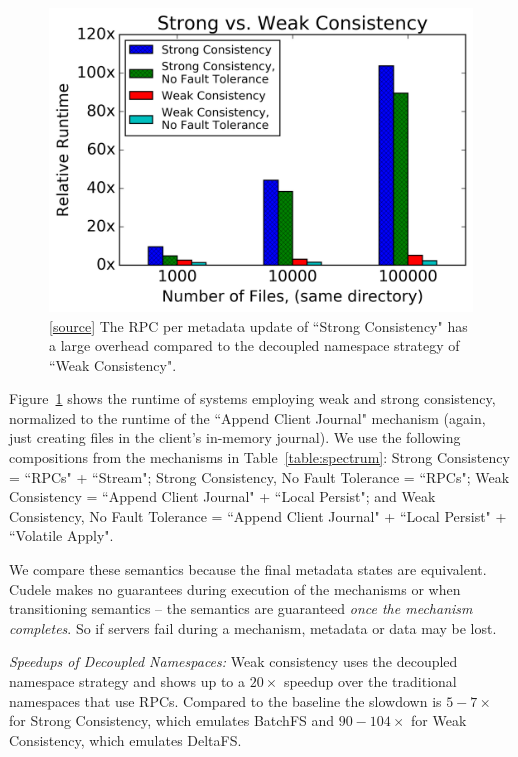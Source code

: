 \begin{figure}[tb]
\centering
\includegraphics[width=1.0\linewidth]{graphs/slowdown-strong-v-weak.png}
\caption{
[\href{https://...}{source}]
The RPC per metadata update of ``Strong Consistency" has a large
overhead compared to the decoupled namespace strategy of ``Weak
Consistency".\label{fig:slowdown-strong-weak}}
\end{figure}

Figure~\ref{fig:slowdown-strong-weak} shows the runtime of systems employing
weak and strong consistency, normalized to the runtime of the ``Append Client Journal"
mechanism (again, just creating files in the client's in-memory journal).  We
use the following compositions from the mechanisms in
Table~\ref{table:spectrum}:  Strong Consistency = ``RPCs" + ``Stream"; Strong
Consistency, No Fault Tolerance = ``RPCs"; Weak Consistency = ``Append Client Journal" +
``Local Persist"; and Weak Consistency, No Fault Tolerance = ``Append Client Journal" +
``Local Persist" + ``Volatile Apply".

We compare these semantics because the final metadata states are equivalent.
Cudele makes no guarantees during execution of the mechanisms or when
transitioning semantics -- the semantics are guaranteed {\it once the mechanism
completes}. So if servers fail during a mechanism, metadata or data may be
lost.

{\it Speedups of Decoupled Namespaces:} Weak consistency uses the
decoupled namespace strategy and shows up to a \(20\times\) speedup over the
traditional namespaces that use RPCs. Compared to the baseline the slowdown is
\(5-7\times\) for Strong Consistency, which emulates BatchFS and
\(90-104\times\) for Weak Consistency, which emulates DeltaFS.

